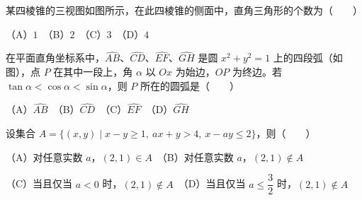 \begin{question}
某四棱锥的三视图如图所示，在此四棱锥的侧面中，直角三角形的个数为\mbox{（　　）}
\nopagebreak[4]
\begin{center}\end{center}
\nopagebreak[4]
（A）$1$　（B）$2$　（C）$3$　（D）$4$

\Needspace{0.4\textheight}
\end{question}
\begin{question}
在平面直角坐标系中，$\widehat{AB}$、$\widehat{CD}$、$\widehat{EF}$、$\widehat{GH}$ 是圆 $x^2+y^2=1$ 上的四段弧（如图），点 $P$ 在其中一段上，角 $\alpha$ 以 $Ox$ 为始边，$OP$ 为终边。若 $\tan\alpha<\cos\alpha<\sin\alpha$，则 $P$ 所在的圆弧是\mbox{（　　）}
\nopagebreak[4]
\begin{center}\end{center}
\nopagebreak[4]
（A）$\widehat{AB}$　（B）$\widehat{CD}$　（C）$\widehat{EF}$　（D）$\widehat{GH}$

\end{question}
\begin{question}
设集合 $A=\{(x,y)\mid x-y\ge1,\ ax+y>4,\ x-ay\le2\}$，则\mbox{（　　）}

（A）对任意实数 $a$，$(2,1)\in A$　（B）对任意实数 $a$，$(2,1)\notin A$

（C）当且仅当 $a<0$ 时，$(2,1)\notin A$　（D）当且仅当 $a\le\dfrac32$ 时，$(2,1)\notin A$

\end{question}


